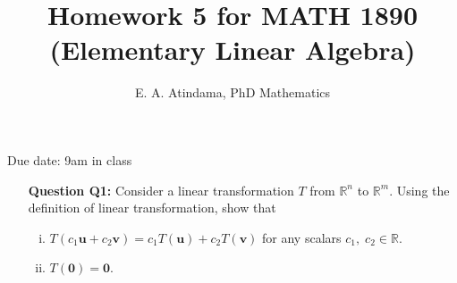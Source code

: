 \documentclass[a4paper,11pt,reqno]{amsart}
\title[MATH 1890 (Elementary Linear Algebra)]{Homework 5 for MATH 1890 (Elementary Linear Algebra)}
\author[Emmanuel Atindama]{E. A. Atindama, PhD Mathematics}
\numberwithin{equation}{section}
\begin{document}
\maketitle
Due date: 9am in class
\vspace{0.5cm}

\begin{enumerate}
    \item[\textbf{Question Q1:}]
    Consider a linear transformation \( T \) from \( \mathbb{R}^n \) to \( \mathbb{R}^m \).
     Using the definition of linear transformation, show that
    \begin{enumerate}[(i)]
        \item \( T(c_1\mathbf{u} + c_2\mathbf{v}) = c_1T(\mathbf{u}) + c_2T(\mathbf{v}) \) for any scalars \( c_1,\; c_2 \in \mathbb{R}\).
        \item \( T(\mathbf{0}) = \mathbf{0} \).
    \end{enumerate}











\end{enumerate}
\end{document}
